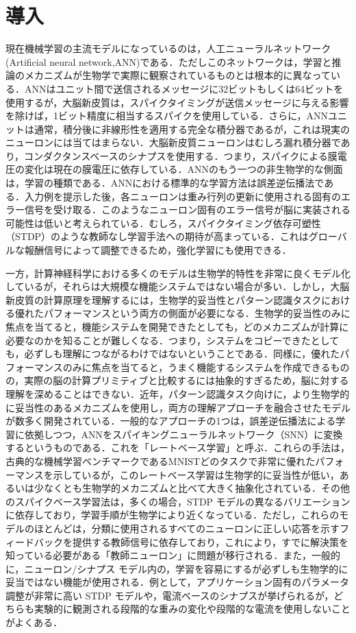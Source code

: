 \documentclass[a4paper, titlepage]{jsarticle}
\begin{document}
\section{導入}
現在機械学習の主流モデルになっているのは，人工ニューラルネットワーク(Artificial neural network,\;ANN)である．ただしこのネットワークは，学習と推論のメカニズムが生物学で実際に観察されているものとは根本的に異なっている．ANNはユニット間で送信されるメッセージに32ビットもしくは64ビットを使用するが，大脳新皮質は，スパイクタイミングが送信メッセージに与える影響を除けば，1ビット精度に相当するスパイクを使用している．さらに，ANNユニットは通常，積分後に非線形性を適用する完全な積分器であるが，これは現実のニューロンには当てはまらない．大脳新皮質ニューロンはむしろ漏れ積分器であり，コンダクタンスベースのシナプスを使用する．つまり，スパイクによる膜電圧の変化は現在の膜電圧に依存している．ANNのもう一つの非生物学的な側面は，学習の種類である．ANNにおける標準的な学習方法は誤差逆伝播法である．入力例を提示した後，各ニューロンは重み行列の更新に使用される固有のエラー信号を受け取る．このようなニューロン固有のエラー信号が脳に実装される可能性は低いと考えられている．むしろ，スパイクタイミング依存可塑性（STDP）のような教師なし学習手法への期待が高まっている．これはグローバルな報酬信号によって調整できるため，強化学習にも使用できる．
\par
一方，計算神経科学における多くのモデルは生物学的特性を非常に良くモデル化しているが，それらは大規模な機能システムではない場合が多い．しかし，大脳新皮質の計算原理を理解するには，生物学的妥当性とパターン認識タスクにおける優れたパフォーマンスという両方の側面が必要になる．生物学的妥当性のみに焦点を当てると，機能システムを開発できたとしても，どのメカニズムが計算に必要なのかを知ることが難しくなる．つまり，システムをコピーできたとしても，必ずしも理解につながるわけではないということである．同様に，優れたパフォーマンスのみに焦点を当てると，うまく機能するシステムを作成できるものの，実際の脳の計算プリミティブと比較するには抽象的すぎるため，脳に対する理解を深めることはできない．近年，パターン認識タスク向けに，より生物学的に妥当性のあるメカニズムを使用し，両方の理解アプローチを融合させたモデルが数多く開発されている．一般的なアプローチの1つは，誤差逆伝播法による学習に依拠しつつ，ANNをスパイキングニューラルネットワーク（SNN）に変換するというものである．これを「レートベース学習」と呼ぶ．これらの手法は，古典的な機械学習ベンチマークであるMNISTどのタスクで非常に優れたパフォーマンスを示しているが，このレートベース学習は生物学的に妥当性が低い，あるいは少なくとも生物学的メカニズムと比べて大きく抽象化されている．その他のスパイクベース学習法は，多くの場合，STDP モデルの異なるバリエーションに依存しており，学習手順が生物学により近くなっている．ただし，これらのモデルのほとんどは，分類に使用されるすべてのニューロンに正しい応答を示すフィードバックを提供する教師信号に依存しており，これにより，すでに解決策を知っている必要がある「教師ニューロン」に問題が移行される．また，一般的に，ニューロン/シナプス モデル内の，学習を容易にするが必ずしも生物学的に妥当ではない機能が使用される．例として，アプリケーション固有のパラメータ調整が非常に高い STDP モデルや，電流ベースのシナプスが挙げられるが，どちらも実験的に観測される段階的な重みの変化や段階的な電流を使用しないことがよくある．
\end{document}
